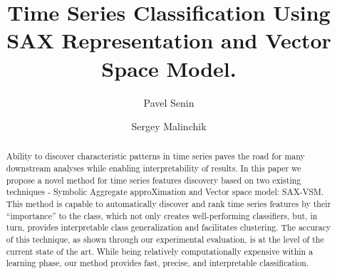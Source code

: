 \documentclass{llncs}
\begin{document}
%
\mainmatter              %
%
\title{Time Series Classification Using SAX Representation and Vector Space Model.}
%
%
\author{Pavel Senin
\and Sergey Malinchik
}
%
%
%


\maketitle              %

\begin{abstract}
Ability to discover characteristic patterns in time series paves the road for many
downstream analyses while enabling interpretability of results. 
In this paper we propose a novel method for time series features discovery based on two existing
techniques - Symbolic Aggregate approXimation and Vector space model: SAX-VSM. 
This method is capable to automatically discover and rank time series features by their
“importance” to the class, which not only creates well-performing classifiers, but, in turn,
provides interpretable class generalization and facilitates clustering. The accuracy of this
technique, as shown  through our experimental evaluation, is at the level of the current state of
the art.  
While being relatively computationally expensive within a learning phase, our method provides fast,
precise, and interpretable classification.
\end{abstract}
%
\end{document}
